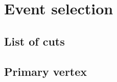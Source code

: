 

\chapter{Event selection}\label{chap:eventSelection}

\section{List of cuts}
\section{Primary vertex}

